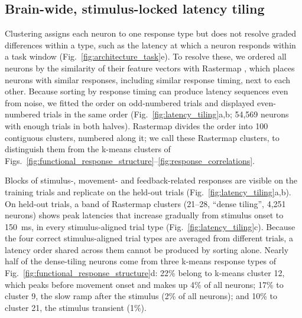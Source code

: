 \documentclass[10pt,lineno]{elife}
\begin{document}
\FloatBarrier
\fi

\subsection{Brain-wide, stimulus-locked latency tiling}

Clustering assigns each neuron to one response type but does not resolve graded differences within a type, such as the latency at which a neuron responds within a task window (Fig.~\ref{fig:architecture_task}e). To resolve these, we ordered all neurons by the similarity of their feature vectors with Rastermap \cite{stringer2024rastermap}, which places neurons with similar responses, including similar response timing, next to each other. Because sorting by response timing can produce latency sequences even from noise, we fitted the order on odd-numbered trials and displayed even-numbered trials in the same order (Fig.~\ref{fig:latency_tiling}a,b; 54,569 neurons with enough trials in both halves). Rastermap divides the order into 100 contiguous clusters, numbered along it; we call these Rastermap clusters, to distinguish them from the k-means clusters of Figs.~\ref{fig:functional_response_structure}--\ref{fig:response_correlations}.

Blocks of stimulus-, movement- and feedback-related responses are visible on the training trials and replicate on the held-out trials (Fig.~\ref{fig:latency_tiling}a,b). On held-out trials, a band of Rastermap clusters (21--28, ``dense tiling'', 4,251 neurons) shows peak latencies that increase gradually from stimulus onset to 150~ms, in every stimulus-aligned trial type (Fig.~\ref{fig:latency_tiling}c). Because the four correct stimulus-aligned trial types are averaged from different trials, a latency order shared across them cannot be produced by sorting alone. Nearly half of the dense-tiling neurons come from three k-means response types of Fig.~\ref{fig:functional_response_structure}d: 22\% belong to k-means cluster 12, which peaks before movement onset and makes up 4\% of all neurons; 17\% to cluster 9, the slow ramp after the stimulus (2\% of all neurons); and 10\% to cluster 21, the stimulus transient (1\%).
\end{document}
